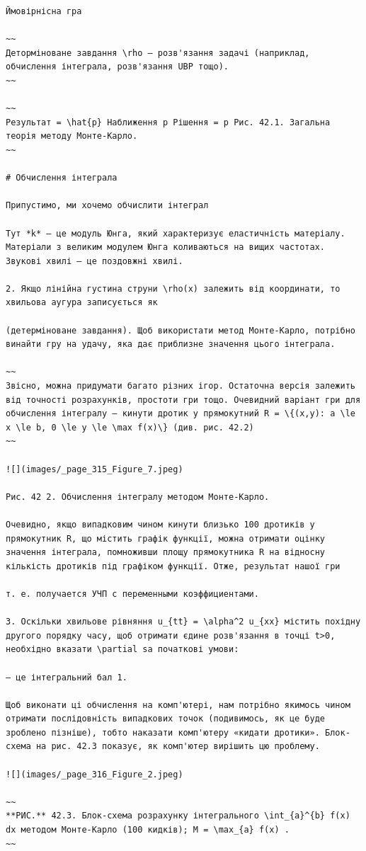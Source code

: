\documentclass[
  ukrainian,
]{article}
\begin{document}
\begin{verbatim}
Ймовірнісна гра

~~
Деторміноване завдання \rho — розв'язання задачі (наприклад, обчислення інтеграла, розв'язання UBP тощо).
~~

~~
Результат = \hat{p} Наближення p Рішення = p Рис. 42.1. Загальна теорія методу Монте-Карло.
~~

# Обчислення інтеграла

Припустимо, ми хочемо обчислити інтеграл

Тут *k* — це модуль Юнга, який характеризує еластичність матеріалу. Матеріали з великим модулем Юнга коливаються на вищих частотах. Звукові хвилі — це поздовжні хвилі.

2. Якщо лінійна густина струни \rho(x) залежить від координати, то хвильова аугура записується як

(детерміноване завдання). Щоб використати метод Монте-Карло, потрібно винайти гру на удачу, яка дає приблизне значення цього інтеграла.

~~
Звісно, можна придумати багато різних ігор. Остаточна версія залежить від точності розрахунків, простоти гри тощо. Очевидний варіант гри для обчислення інтегралу — кинути дротик у прямокутний R = \{(x,y): a \le x \le b, 0 \le y \le \max f(x)\} (див. рис. 42.2)
~~

![](images/_page_315_Figure_7.jpeg)

Рис. 42 2. Обчислення інтегралу методом Монте-Карло.

Очевидно, якщо випадковим чином кинути близько 100 дротиків у прямокутник R, що містить графік функції, можна отримати оцінку значення інтеграла, помноживши площу прямокутника R на відносну кількість дротиків під графіком функції. Отже, результат нашої гри

т. е. получается УЧП с переменными коэффициентами.

3. Оскільки хвильове рівняння u_{tt} = \alpha^2 u_{xx} містить похідну другого порядку часу, щоб отримати єдине розв'язання в точці t>0, необхідно вказати \partial sa початкові умови:

— це інтегральний бал 1.

Щоб виконати ці обчислення на комп'ютері, нам потрібно якимось чином отримати послідовність випадкових точок (подивимось, як це буде зроблено пізніше), тобто наказати комп'ютеру «кидати дротики». Блок-схема на рис. 42.3 показує, як комп'ютер вирішить цю проблему.

![](images/_page_316_Figure_2.jpeg)

~~
**РИС.** 42.3. Блок-схема розрахунку інтегрального \int_{a}^{b} f(x) dx методом Монте-Карло (100 кидків); M = \max_{a} f(x) .
~~


\end{verbatim}
\end{document}

